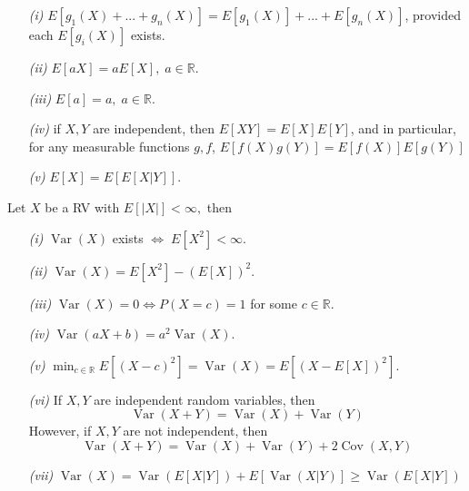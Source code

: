 \documentclass{tufte-handout}
\DeclareMathOperator{\var}{Var}
\DeclareMathOperator{\cov}{Cov}
\begin{document}
\begin{lemma} $  $
  \begin{enumerate}
    \item[\it (i)] $E[g_1(X) + ... + g_n(X)] = E[g_1(X)] + ... + E[g_n(X)]$, provided each $E[g_i(X)]$ exists. 
    \item[\it (ii)] $E[aX] = a E[X], \; a \in \mathbb{R}$. 
    \item[\it (iii)] $E[a] = a, \; a \in \mathbb{R}.$
    \item[\it (iv)] if $X,Y$ are independent, then $E[XY] = E[X]E[Y]$, and in particular, for any measurable functions $g,f$, $E[f(X)g(Y)] = E[f(X)]E[g(Y)]$ 
    \item[\it (v)] $E[X] = E[E[X|Y]]$.
  \end{enumerate}
\end{lemma}
\begin{theorem}
  Let $X$ be a RV with $E[|X|] < \infty, $ then\cite{variance}
  \begin{enumerate}
    \item[\it (i)] $\var(X)$ exists $\iff \; E[X^2]< \infty.$
    \item[\it (ii)] $\var(X) = E[X^2]-(E[X])^2.$
    \item[\it (iii)] $\var (X) = 0 \iff P(X=c) = 1$ for some $c\in \mathbb{R}.$
    \item[\it (iv)] $\var (a X + b) = a^2 \var (X) .$
    \item[\it (v)] $\min_{c\in \mathbb{R}} E[(X -c)^2] = \var (X) = E[(X -E[X])^2].$
    \item[\it (vi)] If $X,Y $ are independent random variables, then $$\var(X+Y) = \var(X)+\var (Y) $$
    However, if $X,Y$ are not independent, then 
    $$\var(X+Y) = \var(X) + \var (Y) +2\cov (X,Y) $$
    \item[\it (vii)] $\var(X) = \var(E[X|Y])+ E[\var (X|Y)] \geq \var(E[X|Y])$
  \end{enumerate}
  
\end{theorem}
\end{document}
